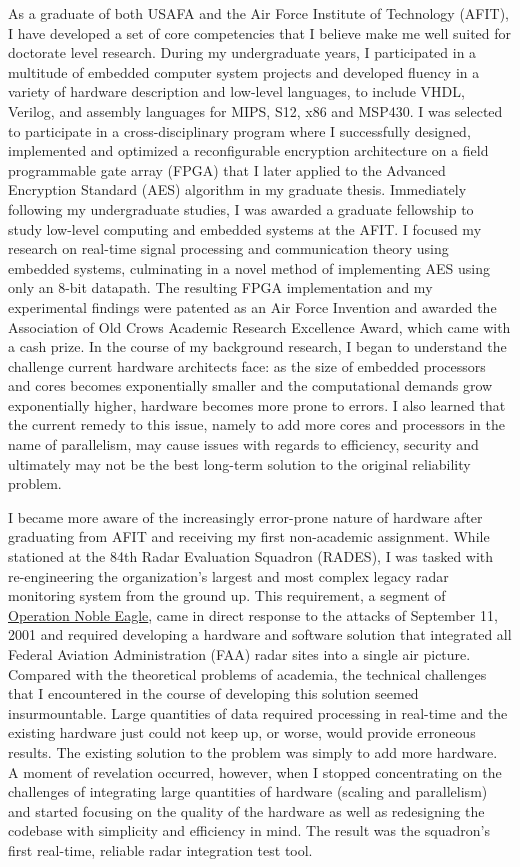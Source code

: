 \documentclass{article}
\begin{document}
As a graduate of both USAFA and the Air Force Institute of Technology
(AFIT), I have developed a set of core competencies that I believe make me well
suited for doctorate level research. During my undergraduate years, I
participated in a multitude of embedded computer system projects and developed fluency in a
variety of hardware description and low-level languages, to include VHDL,
Verilog, and assembly languages for MIPS, S12, x86 and MSP430. I was
selected to participate in a cross-disciplinary
program where I successfully designed, implemented and optimized a
reconfigurable encryption architecture on a field programmable gate array
(FPGA) that I later applied to the Advanced Encryption Standard (AES) algorithm
in my graduate thesis. Immediately following my undergraduate studies, I was
awarded a graduate fellowship to study low-level computing and embedded systems
at the AFIT. I focused my research on real-time
signal processing and communication theory using embedded systems, culminating
in a novel method of implementing AES using only an 8-bit datapath.  The
resulting FPGA implementation and my experimental findings were patented as an Air Force
Invention and awarded the Association of Old Crows Academic Research Excellence
Award, which came with a cash prize. In the course of my background research, I
began to understand the challenge current hardware architects face: as the size
of embedded processors and cores becomes exponentially smaller and the
computational demands grow exponentially higher, hardware becomes more prone to 
errors. I also learned that the current remedy to this issue, namely to add
more cores and processors in the name of parallelism, may cause issues with
regards to efficiency, security and ultimately may not be the best long-term
solution to the original reliability problem.

I became more aware of the increasingly error-prone nature of hardware after
graduating from AFIT and receiving my first non-academic assignment. While
stationed at the 84th Radar Evaluation Squadron (RADES), I was tasked with
re-engineering the organization's largest and most complex legacy radar
monitoring system from the ground up. This requirement, a segment of
\href{http://en.wikipedia.org/wiki/Operation_Noble_Eagle}{Operation Noble
Eagle}, came in direct response to the attacks of September 11, 2001 and
required developing a hardware and software solution that integrated all
Federal Aviation Administration (FAA) radar sites into a single air picture.
Compared with the theoretical problems of academia, the technical challenges that I
encountered in the course of developing this solution seemed insurmountable.
Large quantities of data required processing in real-time and the existing
hardware just could not keep up, or worse, would provide erroneous results. The
existing solution to the problem was simply to add more hardware. A moment of
revelation occurred, however, when I
stopped concentrating on the challenges of integrating large quantities of hardware (scaling and parallelism) and
started focusing on the quality of the hardware as well as redesigning the
codebase with simplicity and efficiency in mind. The result was the squadron's
first real-time, reliable radar integration test tool.
\end{document}
